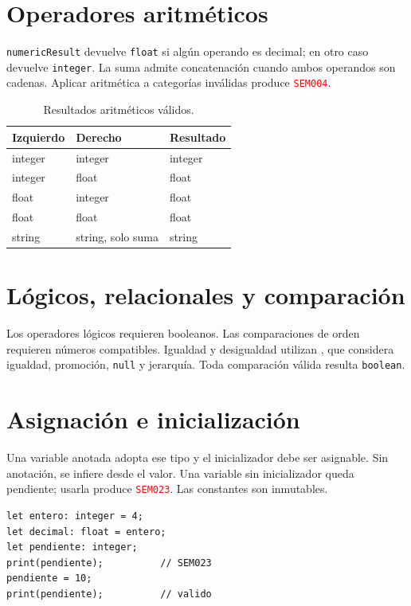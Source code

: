 \documentclass[11pt,letterpaper,oneside]{report}
\newcommand{\archivo}[1]{\path{#1}}
\newcommand{\codigo}[1]{\texttt{#1}}
\newcommand{\diag}[1]{\textcolor{red}{\texttt{#1}}}
\begin{document}
\section{Operadores aritméticos}

\codigo{numericResult} devuelve \codigo{float} si algún operando es decimal; en otro
caso devuelve \codigo{integer}. La suma admite concatenación cuando ambos operandos
son cadenas. Aplicar aritmética a categorías inválidas produce \diag{SEM004}.

\begin{table}[H]
\centering
\begin{tabular}{lll}
\toprule
Izquierdo & Derecho & Resultado \\
\midrule
integer & integer & integer \\
integer & float & float \\
float & integer & float \\
float & float & float \\
string & string, solo suma & string \\
\bottomrule
\end{tabular}
\caption{Resultados aritméticos válidos.}
\end{table}

\section{Lógicos, relacionales y comparación}

Los operadores lógicos requieren booleanos. Las comparaciones de orden requieren
números compatibles. Igualdad y desigualdad utilizan \archivo{isComparable}, que
considera igualdad, promoción, \codigo{null} y jerarquía. Toda comparación válida
resulta \codigo{boolean}.

\section{Asignación e inicialización}

Una variable anotada adopta ese tipo y el inicializador debe ser asignable. Sin
anotación, se infiere desde el valor. Una variable sin inicializador queda pendiente;
usarla produce \diag{SEM023}. Las constantes son inmutables.

\begin{verbatim}
let entero: integer = 4;
let decimal: float = entero;
let pendiente: integer;
print(pendiente);          // SEM023
pendiente = 10;
print(pendiente);          // valido
\end{verbatim}
\end{document}

